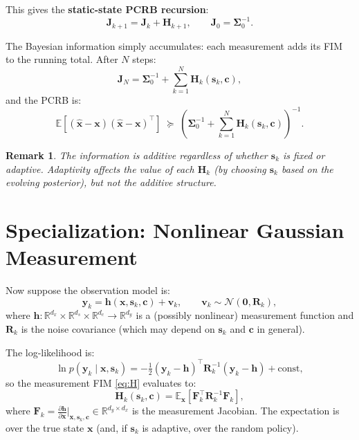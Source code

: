 \documentclass[11pt,a4paper]{article}
\newcommand{\R}{\mathbb{R}}
\newcommand{\E}{\mathbb{E}}
\newtheorem{remark}{Remark}
\begin{document}
This gives the \textbf{static-state PCRB recursion}:
\begin{equation}
  \boxed{\bm{J}_{k+1} = \bm{J}_k + \bm{H}_{k+1}, \qquad \bm{J}_0 = \bm{\Sigma}_0^{-1}.}
  \label{eq:static}
\end{equation}

The Bayesian information simply accumulates: each measurement adds its FIM to the running total.  After $N$ steps:
\begin{equation}
  \bm{J}_N = \bm{\Sigma}_0^{-1} + \sum_{k=1}^{N} \bm{H}_k(\bm{s}_k, \bm{c}),
  \label{eq:JN_static}
\end{equation}
and the PCRB is:
\begin{equation}
  \E\!\left[(\hat{\bm{x}} - \bm{x})(\hat{\bm{x}} - \bm{x})^\top\right] \;\succeq\; \left(\bm{\Sigma}_0^{-1} + \sum_{k=1}^{N} \bm{H}_k(\bm{s}_k, \bm{c})\right)^{-1}.
  \label{eq:pcrb_static}
\end{equation}

\begin{remark}
The information is additive regardless of whether $\bm{s}_k$ is fixed or adaptive.  Adaptivity affects the \emph{value} of each $\bm{H}_k$ (by choosing $\bm{s}_k$ based on the evolving posterior), but not the additive structure.
\end{remark}

\section{Specialization: Nonlinear Gaussian Measurement}

Now suppose the observation model is:
\begin{equation}
  \bm{y}_k = \bm{h}(\bm{x}, \bm{s}_k, \bm{c}) + \bm{v}_k, \qquad \bm{v}_k \sim \mathcal{N}(\bm{0}, \bm{R}_k),
  \label{eq:gauss_obs}
\end{equation}
where $\bm{h}: \R^{d_x} \times \R^{d_s} \times \R^{d_c} \to \R^{d_y}$ is a (possibly nonlinear) measurement function and $\bm{R}_k$ is the noise covariance (which may depend on $\bm{s}_k$ and $\bm{c}$ in general).

The log-likelihood is:
\begin{equation}
  \ln p(\bm{y}_k \mid \bm{x}, \bm{s}_k) = -\tfrac{1}{2}(\bm{y}_k - \bm{h})^\top \bm{R}_k^{-1}(\bm{y}_k - \bm{h}) + \text{const},
\end{equation}
so the measurement FIM \eqref{eq:H} evaluates to:
\begin{equation}
  \bm{H}_k(\bm{s}_k, \bm{c}) = \E_{\bm{x}}\!\left[\bm{F}_k^\top \bm{R}_k^{-1} \bm{F}_k\right],
  \label{eq:H_gauss}
\end{equation}
where $\bm{F}_k = \frac{\partial \bm{h}}{\partial \bm{x}}\big|_{\bm{x}, \bm{s}_k, \bm{c}} \in \R^{d_y \times d_x}$ is the measurement Jacobian.  The expectation is over the true state $\bm{x}$ (and, if $\bm{s}_k$ is adaptive, over the random policy).
\end{document}
